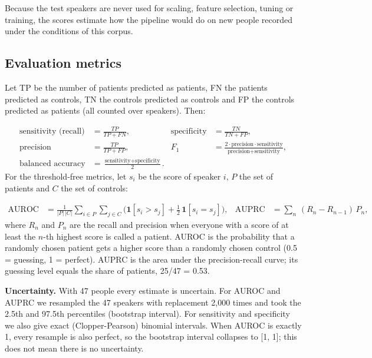 \documentclass[11pt,a4paper]{article}
\begin{document}
\begin{tcolorbox}[colback=blue!3,colframe=blue!50!black,boxrule=0.5pt,arc=2pt,left=5pt,right=5pt,top=3pt,bottom=3pt,title={\small\bfseries What this tells us}]\small Because the test speakers are never used for scaling, feature selection, tuning or training, the scores estimate how the pipeline would do on new people recorded under the conditions of this corpus.\end{tcolorbox}
\subsection{Evaluation metrics}\label{sec:metrics}
Let TP be the number of patients predicted as patients, FN the patients predicted as controls, TN the controls predicted as controls and FP the controls predicted as patients (all counted over speakers). Then:

\begin{align*}
\text{sensitivity (recall)} &= \frac{TP}{TP+FN}, & \text{specificity} &= \frac{TN}{TN+FP},\\[4pt]
\text{precision} &= \frac{TP}{TP+FP}, & F_1 &= \frac{2\cdot\text{precision}\cdot\text{sensitivity}}{\text{precision}+\text{sensitivity}},\\[4pt]
\text{balanced accuracy} &= \frac{\text{sensitivity}+\text{specificity}}{2}. &&
\end{align*}
For the threshold-free metrics, let $s_i$ be the score of speaker $i$, $P$ the set of patients and $C$ the set of controls:

\begin{align*}
\text{AUROC} &= \frac{1}{|P|\,|C|}\sum_{i\in P}\sum_{j\in C}\Big(\mathbf{1}[s_i>s_j]+\tfrac12\,\mathbf{1}[s_i=s_j]\Big), &
\text{AUPRC} &= \sum_{n}\,(R_n-R_{n-1})\,P_n,
\end{align*}
where $R_n$ and $P_n$ are the recall and precision when everyone with a score of at least the $n$-th highest score is called a patient. AUROC is the probability that a randomly chosen patient gets a higher score than a randomly chosen control (0.5 = guessing, 1 = perfect). AUPRC is the area under the precision-recall curve; its guessing level equals the share of patients, 25/47 = 0.53.

\textbf{Uncertainty.} With 47 people every estimate is uncertain. For AUROC and AUPRC we resampled the 47 speakers with replacement 2,000 times and took the 2.5th and 97.5th percentiles (bootstrap interval). For sensitivity and specificity we also give exact (Clopper-Pearson) binomial intervals. When AUROC is exactly 1, every resample is also perfect, so the bootstrap interval collapses to [1, 1]; this does not mean there is no uncertainty.
\end{document}
